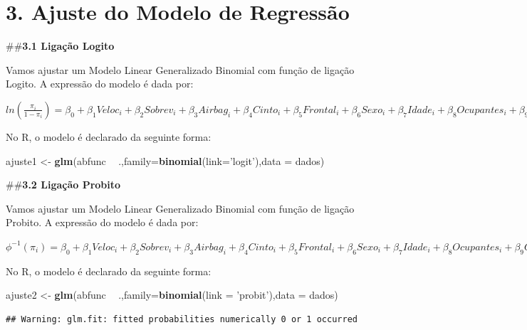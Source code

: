 \documentclass[]{article}
\newenvironment{Shaded}{\begin{snugshade}}{\end{snugshade}}
\newcommand{\KeywordTok}[1]{\textcolor[rgb]{0.13,0.29,0.53}{\textbf{#1}}}
\newcommand{\DataTypeTok}[1]{\textcolor[rgb]{0.13,0.29,0.53}{#1}}
\newcommand{\StringTok}[1]{\textcolor[rgb]{0.31,0.60,0.02}{#1}}
\newcommand{\OperatorTok}[1]{\textcolor[rgb]{0.81,0.36,0.00}{\textbf{#1}}}
\newcommand{\NormalTok}[1]{#1}
\begin{document}
\hypertarget{ajuste-do-modelo-de-regressao}{%
\section{3. Ajuste do Modelo de
Regressão}\label{ajuste-do-modelo-de-regressao}}

\#\#\textbf{3.1 Ligação Logito}

Vamos ajustar um Modelo Linear Generalizado Binomial com função de
ligação Logito. A expressão do modelo é dada por:

\(ln (\frac{\pi_i}{1-\pi_i}) = \beta_0 + \beta_1 Veloc_i + \beta_2 Sobrev_i + \beta_3 Airbag_i + \beta_4 Cinto_i + \beta_5 Frontal_i + \beta_6 Sexo_i + \beta_7 Idade_i + \beta_8 Ocupantes_i + \beta_9 Grav_i\)

No R, o modelo é declarado da seguinte forma:

\begin{Shaded}
\begin{Highlighting}[]
\NormalTok{ajuste1 <-}\StringTok{ }\KeywordTok{glm}\NormalTok{(abfunc }\OperatorTok{~}\StringTok{ }\NormalTok{.,}\DataTypeTok{family=}\KeywordTok{binomial}\NormalTok{(}\DataTypeTok{link=}\StringTok{'logit'}\NormalTok{),}\DataTypeTok{data =}\NormalTok{ dados)}
\end{Highlighting}
\end{Shaded}

\#\#\textbf{3.2 Ligação Probito}

Vamos ajustar um Modelo Linear Generalizado Binomial com função de
ligação Probito. A expressão do modelo é dada por:

\(\phi^{-1} (\pi_i) = \beta_0 + \beta_1 Veloc_i + \beta_2 Sobrev_i + \beta_3 Airbag_i + \beta_4 Cinto_i + \beta_5 Frontal_i + \beta_6 Sexo_i + \beta_7 Idade_i + \beta_8 Ocupantes_i + \beta_9 Grav_i\)

No R, o modelo é declarado da seguinte forma:

\begin{Shaded}
\begin{Highlighting}[]
\NormalTok{ajuste2 <-}\StringTok{ }\KeywordTok{glm}\NormalTok{(abfunc }\OperatorTok{~}\StringTok{ }\NormalTok{.,}\DataTypeTok{family=}\KeywordTok{binomial}\NormalTok{(}\DataTypeTok{link =} \StringTok{'probit'}\NormalTok{),}\DataTypeTok{data =}\NormalTok{ dados)}
\end{Highlighting}
\end{Shaded}

\begin{verbatim}
## Warning: glm.fit: fitted probabilities numerically 0 or 1 occurred
\end{verbatim}
\end{document}
